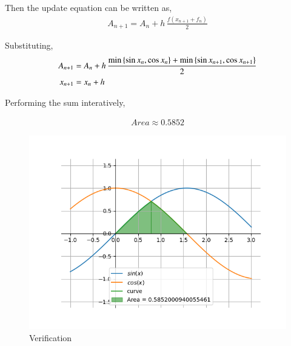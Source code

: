 \documentclass[journal]{IEEEtran}
\begin{document}
    Then the update equation can be written as,
    \begin{align}
        A_{n+1} = A_n + h \,\frac{f(x_{n+1}+f_n)}{2}
    \end{align}
    
    Substituting,
    \begin{align}
        A_{n+1} &= A_n + h\, \frac{\min\left\{\sin{x_n},\cos{x_n}\right\} + \min\left\{\sin{x_{n+1}},\cos{x_{n+1}}\right\}}{2}\\
        x_{n+1} &= x_n + h
    \end{align}

    Performing the sum interatively,
    
    \begin{align}
        Area \approx 0.5852
    \end{align}


    \begin{figure}[ht]  
        \centering  
        \includegraphics[width=\columnwidth]{figs/fig1.png}  
        \caption{Verification}
    \end{figure}
\end{document}
